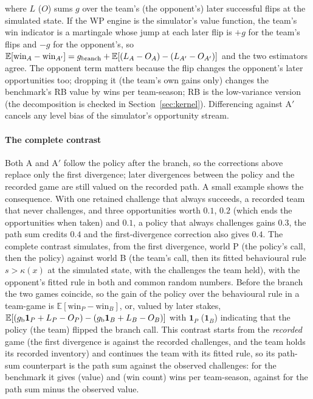 \documentclass[aoas]{imsart}
\theoremstyle{plain}
\theoremstyle{definition}
\newcommand{\E}{\mathbb{E}}
\begin{document}
where $L$ ($O$) sums $g$ over the team's (the opponent's) later successful flips at the simulated state. If the WP
engine is the simulator's value function, the team's win indicator is a martingale whose jump at each later flip is
$+g$ for the team's flips and $-g$ for the opponent's, so
$\E[\text{win}_A-\text{win}_{A'}]=g_{\rm branch}+\E[(L_A-O_A)-(L_{A'}-O_{A'})]$ and the two estimators agree. The
opponent term matters because the flip changes the opponent's later opportunities too; dropping it (the team's own
gains only) changes the benchmark's RB value by \SCausalOppEffect{} wins per team-season; RB is the low-variance
version (the decomposition is checked in Section~\ref{sec:kernel}). Differencing against A$'$ cancels any level bias of
the simulator's opportunity stream.

\paragraph{The complete contrast} Both A and A$'$ follow the policy after the branch, so the corrections above replace
only the first divergence; later divergences between the policy and the recorded game are still valued on the
recorded path. A small example shows the consequence. With one retained challenge that always succeeds, a recorded
team that never challenges, and three opportunities worth $0.1$, $0.2$ (which ends the opportunities when taken) and
$0.1$, a policy that always challenges gains $0.3$, the path sum credits $0.4$ and the first-divergence correction
also gives $0.4$. The complete contrast simulates, from the first divergence, world P (the policy's call, then the
policy) against world B (the team's call, then its fitted behavioural rule $s>\kappa(x)$ at the simulated state, with
the challenges the team held), with the opponent's fitted rule in both and common random numbers. Before the branch the
two games coincide, so the gain of the policy over the behavioural rule in a team-game is $\E[\text{win}_P-\text{win}_B]$,
or, valued by later stakes, $\E[(g_{\rm b}\mathbf 1_P+L_P-O_P)-(g_{\rm b}\mathbf 1_B+L_B-O_B)]$ with $\mathbf 1_P$
($\mathbf 1_B$) indicating that the policy (the team) flipped the branch call. This contrast starts from the
\emph{recorded} game (the first divergence is against the recorded challenges, and the team holds its recorded
inventory) and continues the team with its fitted rule, so its path-sum counterpart is the path sum against the
observed challenges: for the benchmark it gives \FullRB{} \FullRBCI{} (value) and \FullWin{} \FullWinCI{} (win count)
wins per team-season, against \FullPathObs{} for the path sum minus the observed value.
\end{document}
